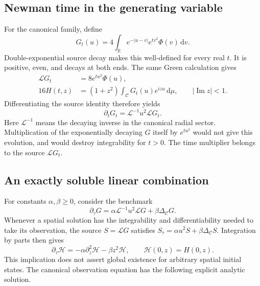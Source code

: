 \documentclass[11pt]{article}
\theoremstyle{remark}
\numberwithin{equation}{section}
\newcommand{\R}{\mathbb R}
\newcommand{\cC}{\mathcal C}
\newcommand{\cL}{\mathcal L}
\newcommand{\dd}{\,\mathrm d}
\begin{document}
\subsection{Newman time in the generating variable}

For the canonical family, define
\begin{equation}\label{eq:Gt}
 G_t(u)=4\int_{\R}e^{-|u-v|}e^{tv^2}\Phi(v)\dd v.
\end{equation}
Double-exponential source decay makes this well-defined for every real
\(t\). It is positive, even, and decays at both ends. The same Green
calculation gives
\begin{align}
 \cL G_t&=8e^{tu^2}\Phi(u),\label{eq:sourceflow}\\
 16H(t,z)&=(1+z^2)\int_{\cC}G_t(u)e^{izu}\dd\mu,
 \qquad |\operatorname{Im}z|<1.\label{eq:time-observation}
\end{align}
Differentiating the source identity therefore yields
\begin{equation}\label{eq:newman-generator}
 \boxed{\partial_tG_t=\cL^{-1}u^2\cL G_t.}
\end{equation}
Here \(\cL^{-1}\) means the decaying inverse in the canonical radial
sector. Multiplication of the exponentially decaying \(G\) itself by
\(e^{tu^2}\) would not give this evolution, and would destroy
integrability for \(t>0\). The time multiplier belongs to the source
\(\cL G_t\).

\subsection{An exactly soluble linear combination}

For constants \(\alpha,\beta\ge0\), consider the benchmark
\begin{equation}\label{eq:combined-generator}
 \partial_\tau G
 =\alpha\cL^{-1}u^2\cL G+\beta\Delta_{\cC}G.
\end{equation}
Whenever a spatial solution has the integrability and differentiability
needed to take its observation, the source \(S=\cL G\) satisfies
\(S_\tau=\alpha u^2S+\beta\Delta_{\cC}S\). Integration by parts
then gives
\begin{equation}\label{eq:combined-observation}
 \partial_\tau\mathscr H
 =-\alpha\partial_z^2\mathscr H-\beta z^2\mathscr H,
 \qquad\mathscr H(0,z)=H(0,z).
\end{equation}
This implication does not assert global existence for arbitrary spatial
initial states. The canonical observation equation has the following
explicit analytic solution.
\end{document}

